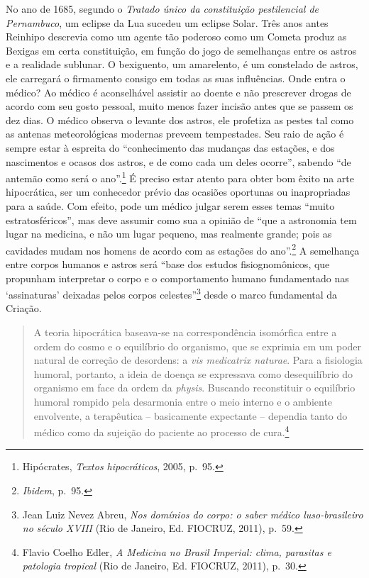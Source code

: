 No ano de 1685, segundo o \emph{Tratado único da constituição
pestilencial de Pernambuco}, um eclipse da Lua sucedeu um eclipse Solar.
Três anos antes Reinhipo descrevia como um agente tão poderoso como um
Cometa produz as Bexigas em certa constituição, em função do jogo de
semelhanças entre os astros e a realidade sublunar. O bexiguento, um
amarelento, é um constelado de astros, ele carregará o firmamento
consigo em todas as suas influências. Onde entra o médico? Ao médico é
aconselhável assistir ao doente e não prescrever drogas de acordo com
seu gosto pessoal, muito menos fazer incisão antes que se passem os dez
dias. O médico observa o levante dos astros, ele profetiza as pestes tal
como as antenas meteorológicas modernas preveem tempestades. Seu raio de
ação é sempre estar à espreita do ``conhecimento das mudanças das
estações, e dos nascimentos e ocasos dos astros, e de como cada um deles
ocorre'', sabendo ``de antemão como será o ano''.\footnote{Hipócrates,
  \emph{Textos hipocráticos}, 2005, p.~95.} É preciso estar atento para
obter bom êxito na arte hipocrática, ser um conhecedor prévio das
ocasiões oportunas ou inapropriadas para a saúde. Com efeito, pode um
médico julgar serem esses temas ``muito estratosféricos'', mas deve
assumir como sua a opinião de ``que a astronomia tem lugar na medicina,
e não um lugar pequeno, mas realmente grande; pois as cavidades mudam
nos homens de acordo com as estações do ano''.\footnote{\emph{Ibidem},
  p.~95.} A semelhança entre corpos humanos e astros será ``base dos
estudos fisiognomônicos, que propunham interpretar o corpo e o
comportamento humano fundamentado nas `assinaturas' deixadas pelos
corpos celestes''\footnote{Jean Luiz Nevez Abreu, \emph{Nos domínios do
  corpo: o saber médico luso-brasileiro no século XVIII} (Rio de
  Janeiro, Ed. FIOCRUZ, 2011), p.~59.} desde o marco fundamental da
Criação.

\begin{quote}
A teoria hipocrática baseava-se na correspondência isomórfica entre a
ordem do cosmo e o equilíbrio do organismo, que se exprimia em um poder
natural de correção de desordens: a \emph{vis medicatrix naturae}. Para
a fisiologia humoral, portanto, a ideia de doença se expressava como
desequilíbrio do organismo em face da ordem da \emph{physis}. Buscando
reconstituir o equilíbrio humoral rompido pela desarmonia entre o meio
interno e o ambiente envolvente, a terapêutica -- basicamente expectante
-- dependia tanto do médico como da sujeição do paciente ao processo de
cura.\footnote{Flavio Coelho Edler, \emph{A Medicina no Brasil Imperial:
  clima, parasitas e patologia tropical} (Rio de Janeiro, Ed. FIOCRUZ,
  2011), p.~30.}
\end{quote}

